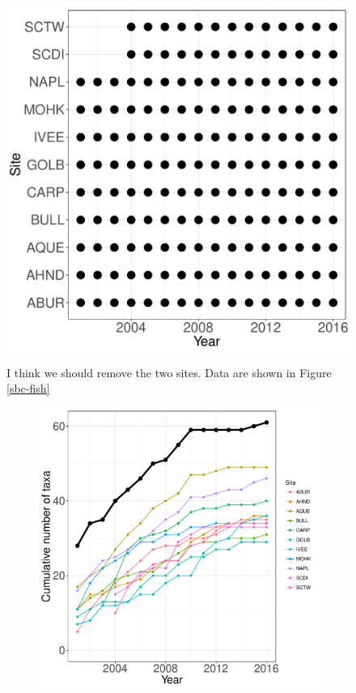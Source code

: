 \documentclass[11pt, oneside]{article}
\begin{document}
\begin{figure}[h!]
\includegraphics[scale = 0.4]{sbc-mobileInverts-castorani_spatiotemporal_sampling_effort.pdf}
\caption{{\bf SBC-mobile invertebrates:} Species accumulation curves (top left),  annual richness (top right), and sampling effort (bottom)  for 36 mobile invertebrate taxa observed at 11 plots in the Santa Barbara Channel LTER (2001-2016). The black lines represent total site-level values across all plots.}
\label{sbc-mobileInverts} I think we should remove the two sites.
Data are shown in Figure \ref{sbc-fish}
\begin{figure}[h!]
\centering
\includegraphics[scale = 0.4]{sbc-fish-castorani_species_accumulation_curve.pdf}

\end{figure}
\end{figure}
\end{document}
